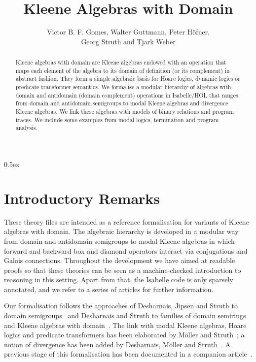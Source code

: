\documentclass[11pt,a4paper]{article}
\begin{document}
\title{Kleene Algebras with Domain}
\author{Victor B. F. Gomes, Walter Guttmann, Peter H{\"o}fner, \\Georg
  Struth and Tjark Weber}
\maketitle

\begin{abstract}
  Kleene algebras with domain are Kleene algebras endowed with an
  operation that maps each element of the algebra to its domain of
  definition (or its complement) in abstract fashion.  They form a
  simple algebraic basis for Hoare logics, dynamic logics or predicate
  transformer semantics.  We formalise a modular hierarchy of algebras
  with domain and antidomain (domain complement) operations in
  Isabelle/HOL that ranges from domain and antidomain semigroups to
  modal Kleene algebras and divergence Kleene algebras.  We link these
  algebras with models of binary relations and program traces.  We
  include some examples from modal logics, termination and program
  analysis.
\end{abstract}

\tableofcontents

\parindent 0pt\parskip 0.5ex

\section{Introductory Remarks}

These theory files are intended as a reference formalisation for
variants of Kleene algebras with domain.  The algebraic hierarchy is
developed in a modular way from domain and antidomain semigroups to
modal Kleene algebras in which forward and backward box and diamond
operators interact via conjugations and Galois connections.
Throughout the development we have aimed at readable proofs so that
these theories can be seen as a machine-checked introduction to
reasoning in this setting.  Apart from that, the Isabelle code is only
sparsely annotated, and we refer to a series of articles for further
information.

Our formalisation follows the approaches of Desharnais, Jipsen and
Struth to domain semigroups~\cite{DesharnaisJipsenStruth} and
Desharnais and Struth to families of domain semirings and Kleene
algebras with domain~\cite{DesharnaisStruthSCP,DesharnaisStruthAMAST}.
The link with modal Kleene algebras, Hoare logics and predicate
transformers has been elaborated by M{\"o}ller and
Struth~\cite{MoellerStruth}; a notion of divergence has been added by
Desharnais, M{\"o}ller and Struth~\cite{DesharnaisMoellerStruthLMCS}.
A previous stage of this formalisation has been documented in a
companion article~\cite{guttmannstruthweber11algmeth}.
\end{document}
